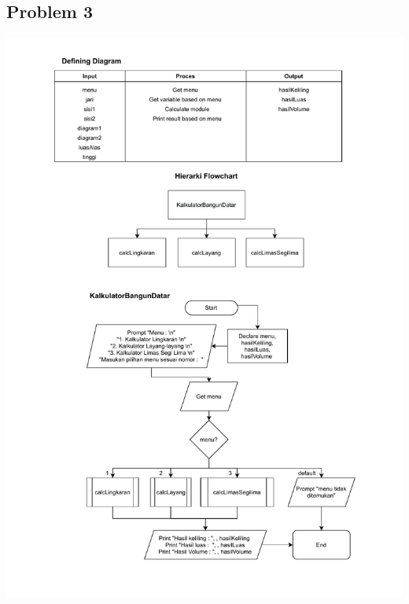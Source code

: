\documentclass[
  12pt,
  answers  
]{exam}
\begin{document}
	\subsection*{Problem 3}
	\begin{center}
		\includegraphics[clip, scale=0.85, trim={2cm 0.5cm 2cm 0.5cm}]{pdf/Problem3-1.pdf}
	\end{center}
	\pagebreak
\end{document}

